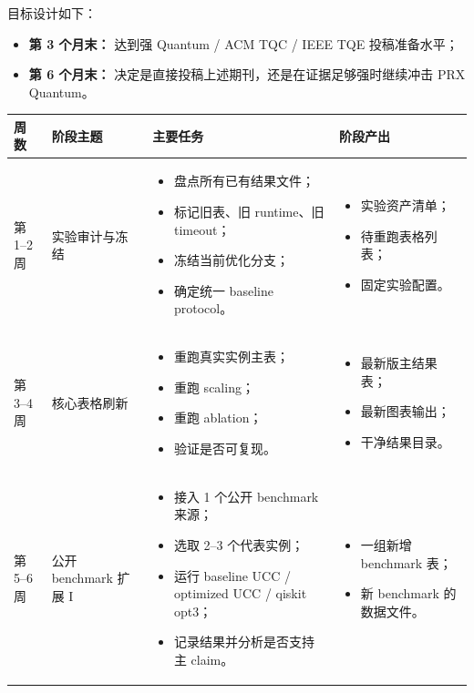 \documentclass[11pt]{article}
\begin{document}
目标设计如下：

\begin{itemize}
    \item \textbf{第 3 个月末：} 达到强 Quantum / ACM TQC / IEEE TQE 投稿准备水平；
    \item \textbf{第 6 个月末：} 决定是直接投稿上述期刊，还是在证据足够强时继续冲击 PRX Quantum。
\end{itemize}

\begin{longtable}{p{} p{} p{} p{}}
\toprule
\textbf{周数} & \textbf{阶段主题} & \textbf{主要任务} & \textbf{阶段产出} \\
\midrule
\endhead

第1--2周 &
实验审计与冻结 &
\begin{itemize}
    \item 盘点所有已有结果文件；
    \item 标记旧表、旧 runtime、旧 timeout；
    \item 冻结当前优化分支；
    \item 确定统一 baseline protocol。
\end{itemize}
&
\begin{itemize}
    \item 实验资产清单；
    \item 待重跑表格列表；
    \item 固定实验配置。
\end{itemize}
\\

第3--4周 &
核心表格刷新 &
\begin{itemize}
    \item 重跑真实实例主表；
    \item 重跑 scaling；
    \item 重跑 ablation；
    \item 验证是否可复现。
\end{itemize}
&
\begin{itemize}
    \item 最新版主结果表；
    \item 最新图表输出；
    \item 干净结果目录。
\end{itemize}
\\

第5--6周 &
公开 benchmark 扩展 I &
\begin{itemize}
    \item 接入 1 个公开 benchmark 来源；
    \item 选取 2--3 个代表实例；
    \item 运行 baseline UCC / optimized UCC / qiskit opt3；
    \item 记录结果并分析是否支持主 claim。
\end{itemize}
&
\begin{itemize}
    \item 一组新增 benchmark 表；
    \item 新 benchmark 的数据文件。
\end{itemize}
\\


\end{longtable}
\end{document}
